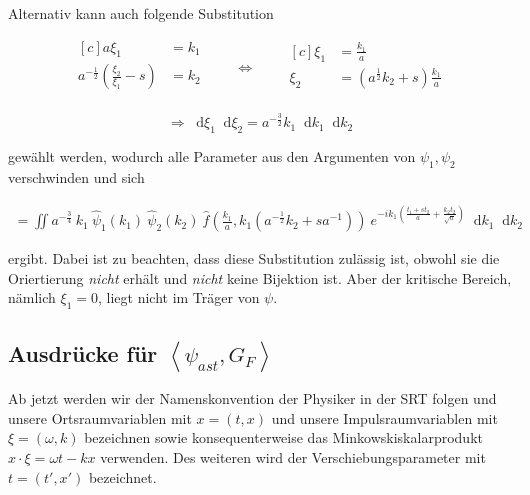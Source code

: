 \documentclass{scrartcl}
\renewcommand*\d{\mathop{}\!\mathrm{d}}
\begin{document}

Alternativ kann auch folgende Substitution

\begin{equation*}
\begin{aligned}[c]
a \xi_1 &= k_1\\
a^{-\frac{1}{2}} \left(\frac{\xi_2}{\xi_1} - s\right) &= k_2\\
\end{aligned}
\qquad\Longleftrightarrow\qquad
\begin{aligned}[c]
\xi_1 &= \frac{k_1}{a}\\
\xi_2 &= \left( a^\frac{1}{2} k_2 +s \right) \frac{k_1}{a}\\
\end{aligned}
\end{equation*}

\begin{equation*}
\Rightarrow
\d \xi_1 \d \xi_2 = a^{-\frac{3}{2}} k_1 \d k_1 \d k_2
\end{equation*}

gewählt werden, wodurch alle Parameter aus den Argumenten von $\psi_1, \psi_2$
verschwinden und sich

\begin{align}
\label{eq:psi_ast_f_2}
    =  \iint a^{-\frac{3}{4}}~ k_1~ \hat \psi_1(k_1)~ \hat \psi_2 (k_2)~
    \hat f \left(\tfrac{k_1}{a}, k_1 \left(a^{-\frac{1}{2}}k_2 + s a^{-1}\right)\right)
    ~e^{-i k_1 \left(\frac{t_1+s t_2}{a} + \frac{k_2 t_2}{\sqrt{a}}\right)}
    \d k_1 \d k_2
\end{align}

ergibt. Dabei ist zu beachten, dass diese Substitution zulässig ist, obwohl sie
die Oriertierung \emph{nicht} erhält und \emph{nicht} keine Bijektion ist. Aber
der kritische Bereich, nämlich $\xi_1 = 0$, liegt nicht im Träger von $\psi$.


\subsection{Ausdrücke für $\left< \psi_{ast}, G_F\right>$} %
\label{sec:psiast_gf}

Ab jetzt werden wir der Namenskonvention der Physiker in der SRT folgen und unsere
Ortsraumvariablen mit $x = (t, x)$ und unsere Impulsraumvariablen mit $\xi = (\omega, k)$
bezeichnen sowie konsequenterweise das Minkowskiskalarprodukt $x \cdot \xi = \omega t - k x$
verwenden. Des weiteren wird der Verschiebungsparameter mit  $t = (t', x')$ bezeichnet.
\end{document}
